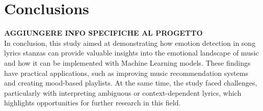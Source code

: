 \chapter*{Conclusions}
\label{ch:conclusions}

\textbf{AGGIUNGERE INFO SPECIFICHE AL PROGETTO}\\

In conclusion, this study aimed at demonstrating how emotion detection in song lyrics stanzas can provide valuable insights into the emotional landscape of music and how it can be implemented with Machine Learning models. 
These findings have practical applications, such as improving music recommendation systems and creating mood-based playlists. 
At the same time, the study faced challenges, particularly with interpreting ambiguous or context-dependent lyrics, which highlights opportunities for further research in this field.


